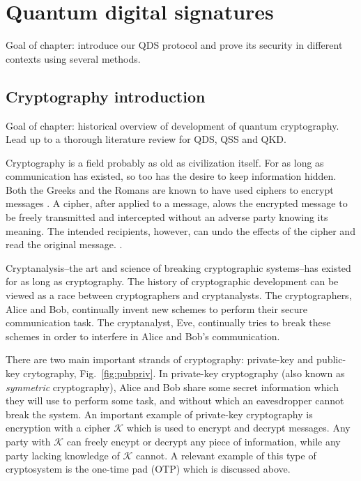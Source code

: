 \chapter{Quantum digital signatures}
Goal of chapter: introduce our QDS protocol and prove its security in different contexts using several methods.

\section{Cryptography introduction}
Goal of chapter: historical overview of development of quantum cryptography. Lead up to a thorough literature review for QDS, QSS and QKD.

Cryptography is a field probably as old as civilization itself. For as long as communication has existed, so too has the desire to keep information hidden. Both the Greeks and the Romans are known to have used ciphers to encrypt messages . A cipher, after applied to a message, alows the encrypted message to be freely transmitted and intercepted without an adverse party knowing its meaning. The intended recipients, however, can undo the effects of the cipher and read the original message. .

Cryptanalysis--the art and science of breaking cryptographic systems--has existed for as long as cryptography. The history of cryptographic development can be viewed as a race between cryptographers and cryptanalysts. The cryptographers, Alice and Bob, continually invent new schemes to perform their secure communication task. The cryptanalyst, Eve, continually tries to break these schemes in order to interfere in Alice and Bob's communication.

There are two main important strands of cryptography: private-key and public-key crytography, Fig.~\ref{fig:pubpriv}. In private-key cryptography (also known as \emph{symmetric} cryptography), Alice and Bob share some secret information which they will use to perform some task, and without which an eavesdropper cannot break the system. An important example of private-key cryptography is encryption with a cipher $\mathcal{K}$ which is used to encrypt and decrypt messages. Any party with $\mathcal{K}$ can freely encypt or decrypt any piece of information, while any party lacking knowledge of $\mathcal{K}$ cannot. A relevant example of this type of cryptosystem is the one-time pad (OTP) which is discussed above.

